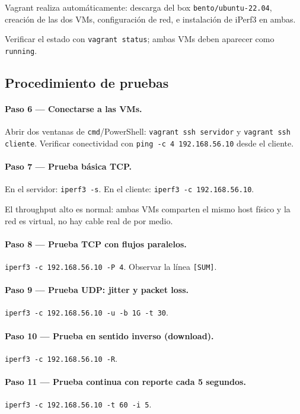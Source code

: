 \documentclass[12pt]{article}
\begin{document}
Vagrant realiza automáticamente: descarga del box \texttt{bento/ubuntu-22.04}, creación de las dos VMs, configuración de red, e instalación de iPerf3 en ambas.

Verificar el estado con \texttt{vagrant status}; ambas VMs deben aparecer como \texttt{running}.

\subsection{Procedimiento de pruebas}

\paragraph{Paso 6 --- Conectarse a las VMs.} Abrir dos ventanas de \texttt{cmd}/PowerShell: \texttt{vagrant ssh servidor} y \texttt{vagrant ssh cliente}. Verificar conectividad con \texttt{ping -c 4 192.168.56.10} desde el cliente.

\paragraph{Paso 7 --- Prueba básica TCP.} En el servidor: \texttt{iperf3 -s}. En el cliente: \texttt{iperf3 -c 192.168.56.10}.

\begin{note}
El throughput alto es normal: ambas VMs comparten el mismo host físico y la red es virtual, no hay cable real de por medio.
\end{note}

\paragraph{Paso 8 --- Prueba TCP con flujos paralelos.} \texttt{iperf3 -c 192.168.56.10 -P 4}. Observar la línea \texttt{[SUM]}.

\paragraph{Paso 9 --- Prueba UDP: jitter y packet loss.} \texttt{iperf3 -c 192.168.56.10 -u -b 1G -t 30}.

\paragraph{Paso 10 --- Prueba en sentido inverso (download).} \texttt{iperf3 -c 192.168.56.10 -R}.

\paragraph{Paso 11 --- Prueba continua con reporte cada 5 segundos.} \texttt{iperf3 -c 192.168.56.10 -t 60 -i 5}.
\end{document}
